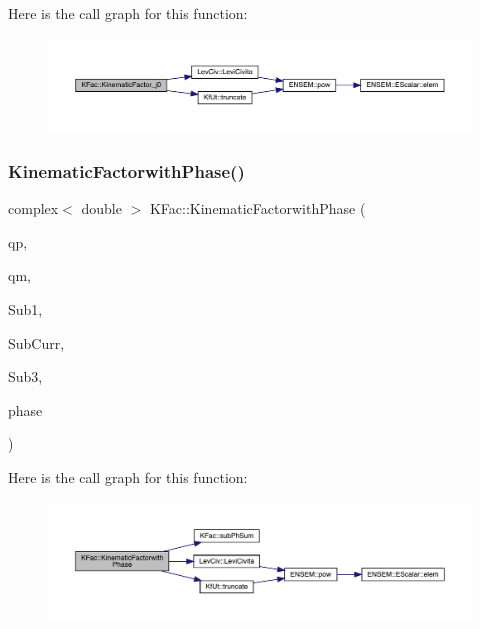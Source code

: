 Here is the call graph for this function\+:\nopagebreak
\begin{figure}[H]
\begin{center}
\leavevmode
\includegraphics[width=350pt]{d2/d89/namespaceKFac_a6f8f443ade2532c958e4dc168d7da1c7_cgraph}
\end{center}
\end{figure}
\mbox{\label{namespaceKFac_a5fe5ea6a5ab8c5c87ca764f254396434}} 
\subsubsection{\texorpdfstring{KinematicFactorwithPhase()}{KinematicFactorwithPhase()}\hspace{0.1cm}{\footnotesize\ttfamily [1/2]}}
{\footnotesize\ttfamily complex$<$ double $>$ K\+Fac\+::\+Kinematic\+Factorwith\+Phase (\begin{DoxyParamCaption}\item[{Eigen\+::\+Vector\+Xd \&}]{qp,  }\item[{Eigen\+::\+Vector\+Xd \&}]{qm,  }\item[{map$<$ int, Eigen\+::\+Matrix\+Xcd $>$ \&}]{Sub1,  }\item[{Eigen\+::\+Matrix\+Xcd \&}]{Sub\+Curr,  }\item[{map$<$ int, Eigen\+::\+Matrix\+Xcd $>$ \&}]{Sub3,  }\item[{\mbox{\hyperlink{structPh_1_1phChars}{Ph\+::ph\+Chars}} \&}]{phase }\end{DoxyParamCaption})}

Here is the call graph for this function\+:\nopagebreak
\begin{figure}[H]
\begin{center}
\leavevmode
\includegraphics[width=350pt]{d2/d89/namespaceKFac_a5fe5ea6a5ab8c5c87ca764f254396434_cgraph}
\end{center}
\end{figure}
\mbox{\label{namespaceKFac_ac10b1bd8db1661c292e327a3eabcebb9}} 

